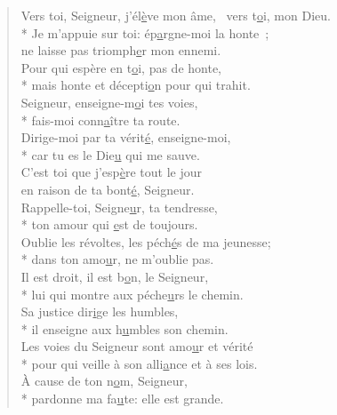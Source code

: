 
\begin{verse}
Vers toi, Seigneur, j’él\underline{è}ve mon âme,~\psalmstar
\vspace{-10pt}vers t\underline{o}i, mon Dieu. \\*
\vspace{10pt}
Je m’appuie sur toi: ép\underline{a}rgne-moi la honte ; \\
ne laisse pas triomph\underline{e}r mon ennemi. \\
Pour qui espère en t\underline{o}i, pas de honte, \\*
mais honte et décepti\underline{o}n pour qui trahit. \\

Seigneur, enseigne-m\underline{o}i tes voies, \\*
fais-moi conn\underline{a}ître ta route. \\
Dirige-moi par ta vérit\underline{é}, enseigne-moi, \\*
car tu es le Die\underline{u} qui me sauve. \\

C’est toi que j’esp\underline{è}re tout le jour \\
en raison de ta bont\underline{é}, Seigneur. \\
Rappelle-toi, Seigne\underline{u}r, ta tendresse, \\*
ton amour qui \underline{e}st de toujours. \\
Oublie les révoltes, les péch\underline{é}s de ma jeunesse; \\*
dans ton amo\underline{u}r, ne m’oublie pas. \\

Il est droit, il est b\underline{o}n, le Seigneur, \\*
lui qui montre aux péche\underline{u}rs le chemin. \\
Sa justice dir\underline{i}ge les humbles, \\*
il enseigne aux h\underline{u}mbles son chemin. \\

Les voies du Seigneur sont amo\underline{u}r et vérité \\*
pour qui veille à son alli\underline{a}nce et à ses lois. \\
À cause de ton n\underline{o}m, Seigneur, \\*
pardonne ma fa\underline{u}te: elle est grande. \\


\end{verse}

